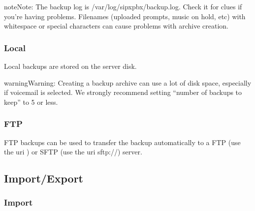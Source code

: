 \documentclass[letterpaper,10pt,english]{sphinxmanual}
\begin{document}
\begin{sphinxadmonition}{note}{Note:}
The backup log is /var/log/sipxpbx/backup.log. Check it for clues if you’re having problems. Filenames (uploaded prompts, music on hold, etc) with whitespace or special characters can cause problems with archive creation.
\end{sphinxadmonition}


\subsubsection{Local}
\label{\detokenize{webui:local}}
Local backups are stored on the server disk.
\begin{quote}

\end{quote}

\begin{sphinxadmonition}{warning}{Warning:}
Creating a backup archive can use a lot of disk space, especially if voicemail is selected.  We strongly recommend setting “number of backups to keep” to 5 or less.
\end{sphinxadmonition}


\subsubsection{FTP}
\label{\detokenize{webui:ftp}}
FTP backups can be used to transfer the backup automatically to a FTP (use the uri ) or SFTP (use the uri sftp://) server.
\begin{quote}

\end{quote}


\subsection{Import/Export}
\label{\detokenize{webui:import-export}}\label{\detokenize{webui:id22}}

\subsubsection{Import}
\label{\detokenize{webui:import}}\begin{quote}

\end{quote}
\end{document}
